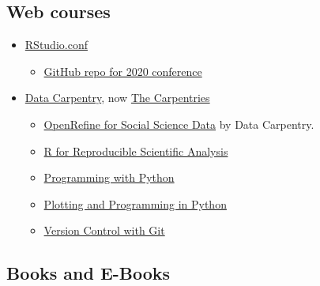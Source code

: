 \documentclass[
]{article}
\providecommand{\tightlist}{%
  \setlength{\itemsep}{0pt}\setlength{\parskip}{0pt}}
\begin{document}
\hypertarget{web-courses}{%
\subsection{Web courses}\label{web-courses}}

\begin{itemize}
\tightlist
\item
  \href{https://rstudio.com/conference/}{RStudio.conf}

  \begin{itemize}
  \tightlist
  \item
    \href{https://github.com/rstudio/rstudio-conf}{GitHub repo for 2020
    conference}
  \end{itemize}
\item
  \href{https://datacarpentry.org/}{Data Carpentry}, now
  \href{https://carpentries.org/}{The Carpentries}

  \begin{itemize}
  \tightlist
  \item
    \href{https://datacarpentry.org/openrefine-socialsci/}{OpenRefine
    for Social Science Data} by Data Carpentry.
  \item
    \href{http://swcarpentry.github.io/r-novice-gapminder/}{R for
    Reproducible Scientific Analysis}
  \item
    \href{http://swcarpentry.github.io/python-novice-inflammation/}{Programming
    with Python}
  \item
    \href{http://swcarpentry.github.io/python-novice-gapminder/}{Plotting
    and Programming in Python}
  \item
    \href{http://swcarpentry.github.io/git-novice/}{Version Control with
    Git}
  \end{itemize}
\end{itemize}

\hypertarget{books-and-e-books}{%
\subsection{Books and E-Books}\label{books-and-e-books}}
\end{document}
